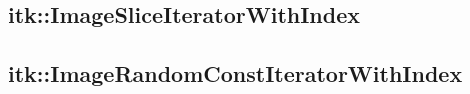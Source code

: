 \subsection{itk::ImageSliceIteratorWithIndex}
\label{sec:itkImageSliceIteratorWithIndex}


\subsection{itk::ImageRandomConstIteratorWithIndex}
\label{sec:itkImageRandomConstIteratorWithIndex}




%

